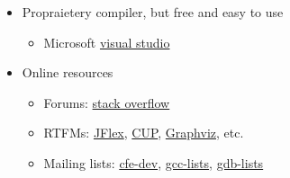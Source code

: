 {\begin{itemize}
\begin{itemize}
\end{itemize}

\item Propraietery compiler, but free and easy to use

\begin{itemize}

\item Microsoft \href{https://visualstudio.microsoft.com/vs/community/}{visual studio}

\end{itemize}

\item Online resources 

\begin{itemize}

\item Forums: \href{https://stackoverflow.com/}{stack overflow}

\item RTFMs:
\href{https://jflex.de/}{JFlex},
\href{https://www.cs.princeton.edu/~appel/modern/java/CUP/}{CUP},
\href{https://www.graphviz.org/}{Graphviz}, etc.

\item Mailing lists:
\href{https://lists.llvm.org/cgi-bin/mailman/listinfo/cfe-dev}{cfe-dev},
\href{https://gcc.gnu.org/lists.html}{gcc-lists},
\href{https://www.gnu.org/software/gdb/mailing-lists/}{gdb-lists}

\end{itemize}

\end{itemize}

}